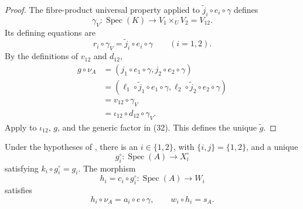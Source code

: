 \begin{proof}
  The fibre-product universal property applied to
  $\widetilde j_i\circ e_i\circ\gamma$ defines
  \[
    \gamma_V\colon\operatorname{Spec}(K)\to V_1\times_UV_2=V_{12}.
  \]
  Its defining equations are
  \[
    r_i\circ\gamma_V=\widetilde j_i\circ e_i\circ\gamma
      \qquad(i=1,2).                                             \tag{31c}
  \]
  By the definitions of $v_{12}$ and $d_{12}$,
  \[
  \begin{aligned}
    g\circ\nu_A
      &=(j_1\circ e_1\circ\gamma,j_2\circ e_2\circ\gamma)\\
      &=(\ell_1\circ\widetilde j_1\circ e_1\circ\gamma,
          \ell_2\circ\widetilde j_2\circ e_2\circ\gamma)\\
      &=v_{12}\circ\gamma_V\\
      &=\iota_{12}\circ d_{12}\circ\gamma_V.
  \end{aligned}                                                    \tag{32}
  \]
  Apply  to
  $\iota_{12}$, $g$, and the generic factor in (32).  This defines the unique
  $\widetilde g$.
\end{proof}

\begin{lemma}
  \label{lemma:nagata-one-valuation-avoids-boundary}

  Under the hypotheses of
  , there is an
  $i\in\{1,2\}$, with $\{i,j\}=\{1,2\}$, and a unique
  \[
    g_i^\circ\colon\operatorname{Spec}(A)\to X_i^\circ
  \]
  satisfying $k_i\circ g_i^\circ=g_i$.  The morphism
  \[
    h_i=c_i\circ g_i^\circ\colon\operatorname{Spec}(A)\to W_i
  \]
  satisfies
  \[
    h_i\circ\nu_A=a_i\circ e\circ\gamma,\qquad
    w_i\circ h_i=s_A.
  \]
\end{lemma}


